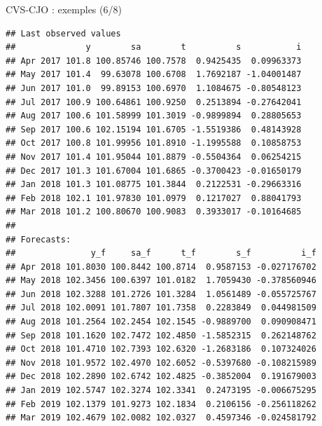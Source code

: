 \documentclass[10pt,xcolor=table,color={dvipsnames,usenames},ignorenonframetext,usepdftitle=false,french]{beamer}
\newenvironment{Shaded}{\begin{snugshade}}{\end{snugshade}}
\newcommand{\NormalTok}[1]{#1}
\newcommand{\OperatorTok}[1]{\textcolor[rgb]{0.81,0.36,0.00}{\textbf{#1}}}
\begin{document}
\begin{frame}[fragile]{CVS-CJO : exemples (6/8)}
\protect\hypertarget{cvs-cjo-exemples-68}{}

\footnotesize

\begin{Shaded}
\end{Shaded}

\begin{verbatim}
## Last observed values
##              y        sa        t          s           i
## Apr 2017 101.8 100.85746 100.7578  0.9425435  0.09963373
## May 2017 101.4  99.63078 100.6708  1.7692187 -1.04001487
## Jun 2017 101.0  99.89153 100.6970  1.1084675 -0.80548123
## Jul 2017 100.9 100.64861 100.9250  0.2513894 -0.27642041
## Aug 2017 100.6 101.58999 101.3019 -0.9899894  0.28805653
## Sep 2017 100.6 102.15194 101.6705 -1.5519386  0.48143928
## Oct 2017 100.8 101.99956 101.8910 -1.1995588  0.10858753
## Nov 2017 101.4 101.95044 101.8879 -0.5504364  0.06254215
## Dec 2017 101.3 101.67004 101.6865 -0.3700423 -0.01650179
## Jan 2018 101.3 101.08775 101.3844  0.2122531 -0.29663316
## Feb 2018 102.1 101.97830 101.0979  0.1217027  0.88041793
## Mar 2018 101.2 100.80670 100.9083  0.3933017 -0.10164685
## 
## Forecasts:
##               y_f     sa_f      t_f        s_f          i_f
## Apr 2018 101.8030 100.8442 100.8714  0.9587153 -0.027176702
## May 2018 102.3456 100.6397 101.0182  1.7059430 -0.378560946
## Jun 2018 102.3288 101.2726 101.3284  1.0561489 -0.055725767
## Jul 2018 102.0091 101.7807 101.7358  0.2283849  0.044981509
## Aug 2018 101.2564 102.2454 102.1545 -0.9889700  0.090908471
## Sep 2018 101.1620 102.7472 102.4850 -1.5852315  0.262148762
## Oct 2018 101.4710 102.7393 102.6320 -1.2683186  0.107324026
## Nov 2018 101.9572 102.4970 102.6052 -0.5397680 -0.108215989
## Dec 2018 102.2890 102.6742 102.4825 -0.3852004  0.191679003
## Jan 2019 102.5747 102.3274 102.3341  0.2473195 -0.006675295
## Feb 2019 102.1379 101.9273 102.1834  0.2106156 -0.256118262
## Mar 2019 102.4679 102.0082 102.0327  0.4597346 -0.024581792
\end{verbatim}

\end{frame}
\end{document}
